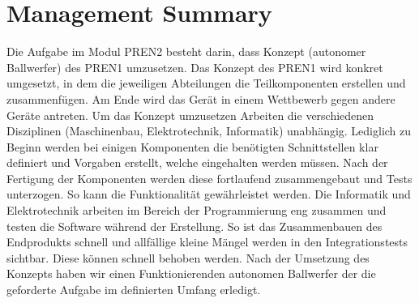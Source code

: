 \section*{Management Summary}
Die Aufgabe im Modul PREN2 besteht darin, dass Konzept 
(autonomer Ballwerfer) des PREN1 umzusetzen. Das Konzept
des PREN1 wird konkret umgesetzt, in dem die jeweiligen
Abteilungen die Teilkomponenten erstellen und zusammenfügen.
Am Ende wird das Gerät in einem Wettbewerb gegen andere
Geräte antreten. Um das Konzept umzusetzen Arbeiten die 
verschiedenen Disziplinen (Maschinenbau, Elektrotechnik, Informatik) 
unabhängig. Lediglich zu Beginn werden bei einigen Komponenten die 
benötigten Schnittstellen klar definiert und Vorgaben erstellt,
welche eingehalten werden müssen. Nach der Fertigung der
Komponenten werden diese fortlaufend zusammengebaut und Tests 
unterzogen. So kann die Funktionalität gewährleistet werden. 
Die Informatik und Elektrotechnik arbeiten im Bereich der 
Programmierung eng zusammen und testen die Software während 
der Erstellung. So ist das Zusammenbauen des Endprodukts schnell 
und allfällige kleine Mängel werden in den Integrationstests 
sichtbar. Diese können schnell behoben werden. Nach der 
Umsetzung des Konzepts haben wir einen Funktionierenden 
autonomen Ballwerfer der die geforderte Aufgabe im definierten 
Umfang erledigt.
